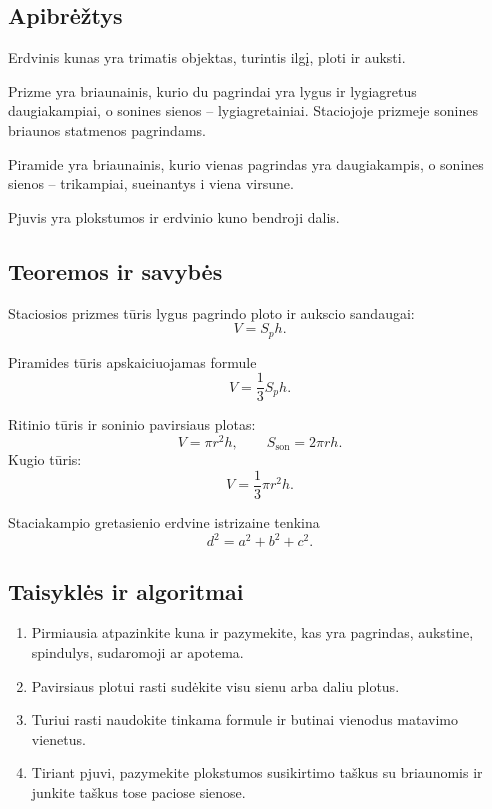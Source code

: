 \subsection{Apibrėžtys}
\begin{apibreztis}
Erdvinis kunas yra trimatis objektas, turintis ilgį, ploti ir auksti.
\end{apibreztis}
\begin{apibreztis}
Prizme yra briaunainis, kurio du pagrindai yra lygus ir lygiagretus daugiakampiai, o sonines sienos -- lygiagretainiai. Staciojoje prizmeje sonines briaunos statmenos pagrindams.
\end{apibreztis}
\begin{apibreztis}
Piramide yra briaunainis, kurio vienas pagrindas yra daugiakampis, o sonines sienos -- trikampiai, sueinantys i viena virsune.
\end{apibreztis}
\begin{apibreztis}
Pjuvis yra plokstumos ir erdvinio kuno bendroji dalis.
\end{apibreztis}

\subsection{Teoremos ir savybės}
\begin{savybe}
Staciosios prizmes tūris lygus pagrindo ploto ir aukscio sandaugai:
\[
V=S_p h.
\]
\end{savybe}
\begin{savybe}
Piramides tūris apskaiciuojamas formule
\[
V=\frac13 S_p h.
\]
\end{savybe}
\begin{savybe}
Ritinio tūris ir soninio pavirsiaus plotas:
\[
V=\pi r^2h,\qquad S_{\text{son}}=2\pi rh.
\]
Kugio tūris:
\[
V=\frac13\pi r^2h.
\]
\end{savybe}
\begin{savybe}
Staciakampio gretasienio erdvine istrizaine tenkina
\[
d^2=a^2+b^2+c^2.
\]
\end{savybe}

\subsection{Taisyklės ir algoritmai}
\begin{enumerate}[label=\arabic*.]
\item Pirmiausia atpazinkite kuna ir pazymekite, kas yra pagrindas, aukstine, spindulys, sudaromoji ar apotema.
\item Pavirsiaus plotui rasti sudėkite visu sienu arba daliu plotus.
\item Turiui rasti naudokite tinkama formule ir butinai vienodus matavimo vienetus.
\item Tiriant pjuvi, pazymekite plokstumos susikirtimo taškus su briaunomis ir junkite taškus tose paciose sienose.
\end{enumerate}
